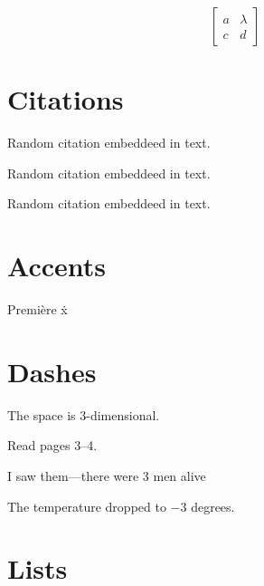\documentclass[12pt,letterpaper,titlepage]{report}
\begin{document}
\[\begin{bmatrix}
		a & \lambda \\
		c & d
	\end{bmatrix}\]



\section{Citations}


Random citation \autocite{nguyen_widrow_1990} embeddeed in text.

Random citation \autocite{DUMMY:1} embeddeed in text.

Random citation \autocite{nguyen_widrow_1990} embeddeed in text.
\autocite{negenborn_2003} \autocite{labbe_2017}

\section{Accents}

Premi\`ere	\.x

\section{Dashes}

The space is 3-dimensional.

Read pages 3--4.

I saw them---there were 3 men alive

The temperature dropped to $-$3 degrees.

\section{Lists}
\end{document}
